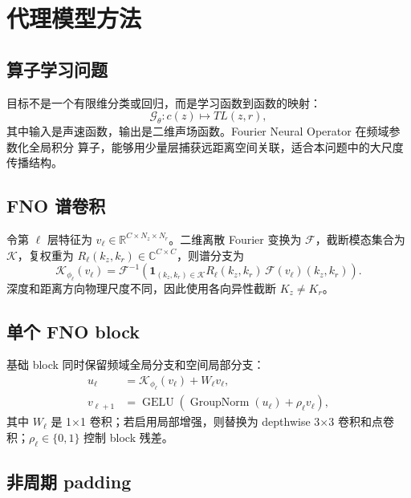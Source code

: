 \documentclass[UTF8,12pt,openany]{ctexrep}
\begin{document}
\chapter{代理模型方法}
\label{chap:model}

\section{算子学习问题}

目标不是一个有限维分类或回归，而是学习函数到函数的映射：
\begin{equation}
  \mathcal{G}_{\theta}:c(z)\longmapsto TL(z,r),
\end{equation}
其中输入是声速函数，输出是二维声场函数。Fourier Neural Operator 在频域参数化全局积分
算子，能够用少量层捕获远距离空间关联，适合本问题中的大尺度传播结构。

\section{FNO 谱卷积}

令第 $\ell$ 层特征为 $v_\ell\in\mathbb{R}^{C\times N_z\times N_r}$。二维离散 Fourier
变换为 $\mathcal{F}$，截断模态集合为 $\mathcal{K}$，复权重为
$R_\ell(k_z,k_r)\in\mathbb{C}^{C\times C}$，则谱分支为
\begin{equation}
  \mathcal{K}_{\phi_\ell}(v_\ell)=
  \mathcal{F}^{-1}\left(
  \mathbf{1}_{(k_z,k_r)\in\mathcal{K}}
  R_\ell(k_z,k_r)\,\mathcal{F}(v_\ell)(k_z,k_r)
  \right).
\end{equation}
深度和距离方向物理尺度不同，因此使用各向异性截断 $K_z\neq K_r$。

\section{单个 FNO block}

基础 block 同时保留频域全局分支和空间局部分支：
\begin{align}
  u_\ell &= \mathcal{K}_{\phi_\ell}(v_\ell)+W_\ell v_\ell,\\
  v_{\ell+1} &= \operatorname{GELU}\left(
  \operatorname{GroupNorm}(u_\ell)+\rho_\ell v_\ell\right),
\end{align}
其中 $W_\ell$ 是 1$\times$1 卷积；若启用局部增强，则替换为 depthwise 3$\times$3
卷积和点卷积；$\rho_\ell\in\{0,1\}$ 控制 block 残差。

\section{非周期 padding}
\end{document}
